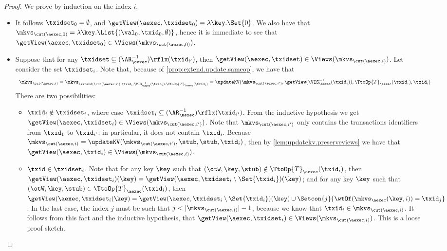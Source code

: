 \begin{proof}
We prove by induction on the index $i$. 
\begin{itemize}
\item {} It follows $\txidset_{0} = \emptyset$, and $\getView(\aexec, \txidset_{0}) = \lambda \key. \Set{0}$. 
We also have that $\mkvs_{\cut(\aexec, 0)} = \lambda \key. \List{(\val_0, \txid_{0}, \emptyset)}$, hence 
it is immediate to see that $\getView(\aexec, \txidset_{0}) \in \Views(\mkvs_{\cut(\aexec, 0)})$.

\item {}
Suppose that for any $\txidset \subseteq (\AR_{\aexec}^{-1})\rflx(\txid_{i'})$, 
then $\getView(\aexec, \txidset) \in \Views(\mkvs_{\cut(\aexec, i)})$. 
Let consider the set $\txidset_{i}$.
Note that, because of \cref{prop:extend.update.sameop}, we have that
\[
\begin{array}{l}
\mkvs_{\cut(\aexec, i)} =
\mkvs_{\extend(\cut(\aexec, i'), \txid_{i}, \VIS^{-1}_{\aexec}(\txid_{i}), \TtoOp{T}_{\aexec}(\txid_{i})} 
= \updateKV(\mkvs_{\cut(\aexec, i')}, \getView(\VIS^{-1}_{\aexec}(\txid_{i})), \TtoOp{T}_{\aexec}(\txid_{i}), \txid_{i})
\end{array}
\]
There are two possibilities:
\begin{itemize}
\item $\txid_{i} \notin \txidset_{i}$, where case $\txidset_{i} \subseteq (\AR_{\aexec}^{-1})\rflx(\txid_{i'})$.
From the inductive hypothesis we get $\getView(\aexec, \txidset_{i}) \in \Views(\mkvs_{\cut(\aexec, i')})$. 
Note that $\mkvs_{\cut(\aexec, i')}$ only contains the transactions identifiers from $\txid_{1}$ to $\txid_{i'}$;
in particular, it does not contain $\txid_{i}$. 
Because $\mkvs_{\cut(\aexec, i)} = \updateKV(\mkvs_{\cut(\aexec, i')}, \stub, \stub, \txid_{i})$, 
then by \cref{lem:updatekv.preserveviews} we have that $\getView(\aexec, \txid_{i}) \in \Views(\mkvs_{\cut(\aexec, i)})$.

\item $\txid \in \txidset_{i}$. Note that for any key $\key$ such that 
$(\otW, \key, \stub) \notin \TtoOp{T}_{\aexec}(\txid_{i})$, then 
$\getView(\aexec, \txidset_{i})(\key) = \getView(\aexec, \txidset_{i} \setminus \Set{\txid_{i}})(\key)$; 
and for any key $\key$ such that $(\otW, \key, \stub) \in \TtoOp{T}_{\aexec}(\txid_{i})$, 
then $\getView(\aexec, \txidset_{i}(\key) = \getView(\aexec, \txidset_{i} \setminus \Set{\txid_{i}})(\key) 
\cup \Setcon{j }{ \wtOf(\mkvs_{\aexec}(\key, i)) = \txid_{j}}$. 
In the last case, the index $j$ must be such that $j < \lvert \mkvs_{\cut(\aexec, i)} \rvert - 1$, 
because we know that $\txid_{i} \in \mkvs_{\cut(\aexec, i)}$. 
It follows from this fact and the inductive hypothesis, 
that $\getView(\aexec, \txidset_{i}) \in \Views(\mkvs_{\cut(\aexec, i)})$.
\ac{This is a loose proof sketch.} 
\end{itemize}
\end{itemize}
\end{proof}

